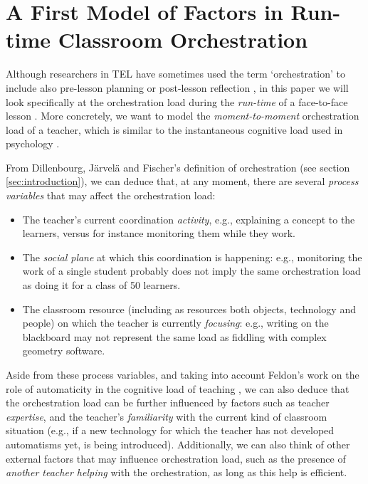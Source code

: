 \documentclass[10pt,journal,compsoc]{IEEEtran}
\begin{document}
\section{A First Model of Factors in Run-time Classroom Orchestration}
\label{sec:model}

Although researchers in TEL have sometimes used the term `orchestration' to include also pre-lesson planning or post-lesson reflection \cite{Prieto2011}, in this paper we will look specifically at the orchestration load during the \textit{run-time} of a face-to-face lesson \cite{Dillenbourg2013}. More concretely, we want to model the \textit{moment-to-moment} orchestration load of a teacher, which is similar to the instantaneous cognitive load used in psychology \cite{xie2000prediction}.

From Dillenbourg, J\"arvel\"a and Fischer's definition of orchestration \cite{Dillenbourg2009} (see section \ref{sec:introduction}), we can deduce that, at any moment, there are several \textit{process variables} that may affect the orchestration load: 

\begin{itemize}
\item The teacher's current coordination \textit{activity}, e.g., explaining a concept to the learners, versus for instance monitoring them while they work.
\item The \textit{social plane} at which this coordination is happening: e.g., monitoring the work of a single student probably does not imply the same orchestration load as doing it for a class of 50 learners.
\item The classroom resource (including as resources both objects, technology and people) on which the teacher is currently \textit{focusing}: e.g., writing on the blackboard may not represent the same load as fiddling with complex geometry software.
\end{itemize}

Aside from these process variables, and taking into account Feldon's work on the role of automaticity in the cognitive load of teaching \cite{feldon2007cognitive}, we can also deduce that the orchestration load can be further influenced by factors such as teacher \textit{expertise}, and the teacher's \textit{familiarity} with the current kind of classroom situation (e.g., if a new technology for which the teacher has not developed automatisms yet, is being introduced). Additionally, we can also think of other external factors that may influence orchestration load, such as the presence of \textit{another teacher helping} with the orchestration, as long as this help is efficient.
\end{document}
